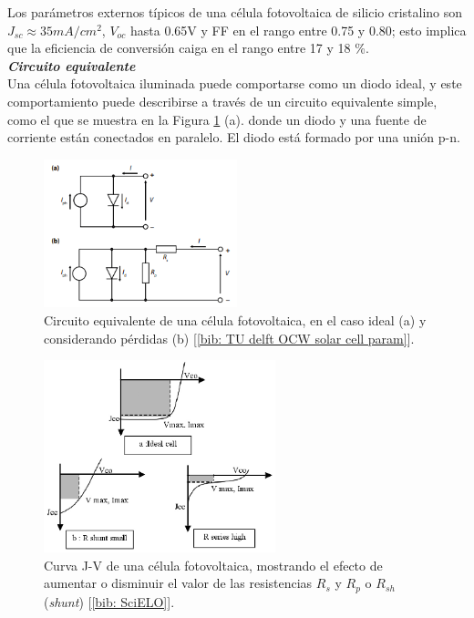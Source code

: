 \documentclass[12pt]{article}
\begin{document}
	\noindent Los parámetros externos típicos de una célula fotovoltaica de silicio cristalino son $J_{sc} \approx 35 mA/cm^2$, $V_{oc}$ hasta 0.65V y FF en el rango entre 0.75 y 0.80; esto implica que la eficiencia de conversión caiga en el rango entre 17 y 18 \%. \\
	
	\noindent \textit{\textbf{Circuito equivalente}} \\
	
	\noindent Una célula fotovoltaica iluminada puede comportarse como un diodo ideal, y este comportamiento puede describirse a través de un circuito equivalente simple, como el que se muestra en la Figura \ref{fig: equivalent circuit solar cell} (a). donde un diodo y una fuente de corriente están conectados en paralelo. El diodo está formado por una unión p-n. \\
	
	\begin{figure}[h]
		\begin{center}
			\includegraphics[width=0.5\textwidth]{img/circuitEquivalent_solarCell.png}
			\caption{Circuito equivalente de una célula fotovoltaica, en el caso ideal (a) y considerando pérdidas (b) [\ref{bib: TU delft OCW solar cell param}].}
			\label{fig: equivalent circuit solar cell}
		\end{center}
	\end{figure}
	
	\pagebreak
	
	\begin{figure}[h]
		\begin{center}
			\includegraphics[width=0.6\textwidth]{img/JV_curve_withRsRp.png}
			\caption{Curva J-V de una célula fotovoltaica, mostrando el efecto de aumentar o disminuir el valor de las resistencias $R_{s}$ y $R_{p}$ o $R_{sh}$ (\textit{shunt}) [\ref{bib: SciELO}].}
			\label{fig: JV curve with non-ideal model (one diode)}
		\end{center}
	\end{figure}
\end{document}
